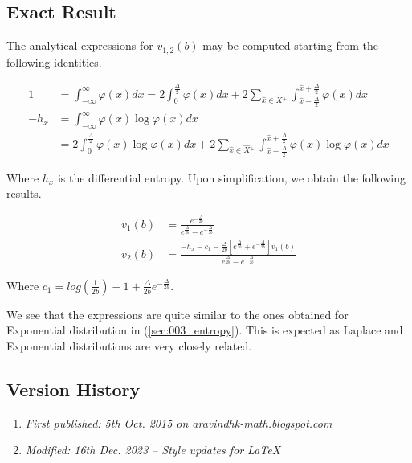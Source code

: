 \subsection{Exact Result}

The analytical expressions for $v_{1,2}(b)$ may be computed starting from the following identities.

\begin{align} 1 &= \int_{-\infty}^{\infty} \varphi(x) dx = 2 \int_{0}^{\frac{\Delta}{2}} \varphi(x) dx + 2 \sum_{\hat{x} \in \hat{X}{}^+} \int_{\hat{x} - \frac{\Delta}{2}}^{\hat{x} + \frac{\Delta}{2}} \varphi(x) dx \\ -h_x &= \int_{-\infty}^{\infty} \varphi(x) \log \varphi(x) dx  \nonumber\\ &= 2 \int_{0}^{\frac{\Delta}{2}} \varphi(x) \log \varphi(x) dx + 2 \sum_{\hat{x} \in \hat{X}{}^+} \int_{\hat{x} - \frac{\Delta}{2}}^{\hat{x} + \frac{\Delta}{2}} \varphi(x) \log \varphi(x) dx \end{align}

Where $h_x$ is the differential entropy. Upon simplification, we obtain the following results.

\begin{align} v_1(b) &= \frac{e^{-\frac{\Delta}{2b}}}{e^{\frac{\Delta}{2b}} - e^{-\frac{\Delta}{2b}}} \\ v_2(b) &= \frac{-h_x - c_1 - \frac{\Delta}{2b} \left[ e^{\frac{\Delta}{2b}} + e^{-\frac{\Delta}{2b}} \right] v_1(b)}{e^{\frac{\Delta}{2b}} - e^{-\frac{\Delta}{2b}}}\end{align}

Where $c_1 = log\left(\frac{1}{2b}\right) - 1 + \frac{\Delta}{2b}e^{-\frac{\Delta}{2b}}$.

We see that the expressions are quite similar to the ones obtained for Exponential distribution in (\ref{sec:003_entropy}). This is expected as Laplace and Exponential distributions are very closely related.

\subsection{Version History}
\begin{enumerate}
	\item \emph{First published: 5th Oct. 2015 on aravindhk-math.blogspot.com}
	\item \emph{Modified: 16th Dec. 2023 -- Style updates for \LaTeX}
\end{enumerate}


